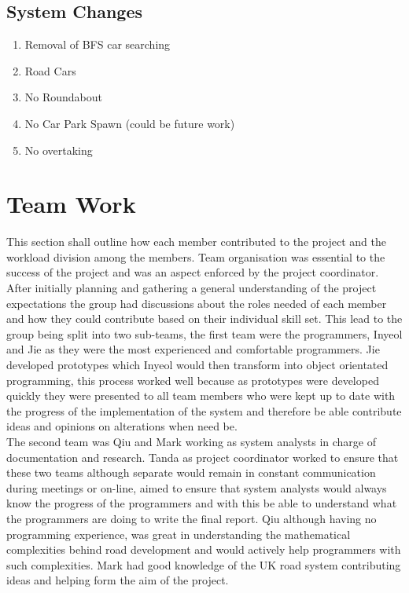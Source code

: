 \documentclass[11pt]{article}
\begin{document}
\subsection{System Changes}
\begin{enumerate}[noitemsep]
	\item Removal of BFS car searching 
	\item Road Cars
	\item No Roundabout 
	\item No Car Park Spawn (could be future work) 
	\item No overtaking
\end{enumerate}

\section{Team Work}
This section shall outline how each member contributed to the project and the workload division among the members. Team organisation was essential to the success of the project and was an aspect enforced by the project coordinator. After initially planning and gathering a general understanding of the project expectations the group had discussions about the roles needed of each member and how they could contribute based on their individual skill set. This lead to the group being split into two sub-teams, the first team were the programmers, Inyeol and Jie as they were the most experienced and comfortable programmers. Jie developed prototypes which Inyeol would then transform into object orientated programming, this process worked well because as prototypes were developed quickly they were presented to all team members who were kept up to date with the progress of the implementation of the system and therefore be able contribute ideas and opinions on alterations when need be.\\
The second team was Qiu and Mark working as system analysts in charge of documentation and research. Tanda as project coordinator worked to ensure that these two teams although separate would remain in constant communication during meetings or on-line, aimed to ensure that system analysts would always know the progress of the programmers and with this be able to understand what the programmers are doing to write the final report.  Qiu although having no programming experience, was great in understanding the mathematical complexities behind road development and would actively help programmers with such complexities. Mark had good knowledge of the UK road system contributing ideas and helping form the aim of the project. 
\end{document}
